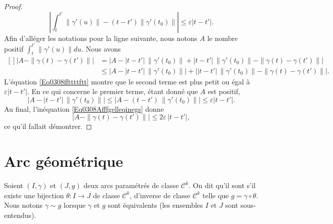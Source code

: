\begin{proof}
    \begin{equation}
        \left| \int_t^{t'}\big\| \gamma'(u) \big\|-(t-t')\big\| \gamma'(t_0) \big\| \right| \leq\varepsilon| t-t' |.
    \end{equation}
    Afin d'alléger les notations pour la ligne suivante, nous notons $A$ le nombre positif $\int_t^{t'}\| \gamma'(u) \|du$. Nous avons
    \begin{equation}        \label{Eq0308Afffgelleqinegs}
        \begin{aligned}[]
        \Big| A-\| \gamma(t)-\gamma(t')\| \Big| &=\Big| A-| t-t' |\,\| \gamma'(t_0) \|+| t-t' |\,\| \gamma'(t_0) \|-\| \gamma(t)-\gamma(t') \| \Big| \\
                &\leq\Big|  A-| t-t' |\,\| \gamma'(t_0) \|  \Big|+\Big| | t-t' |\,\| \gamma'(t_0) \|-\| \gamma(t)-\gamma(t') \|    \Big|.
        \end{aligned}
    \end{equation}
    L'équation \eqref{Eq0308ffttttftt} montre que le second terme est plus petit ou égal à $\varepsilon| t-t' |$. En ce qui concerne le premier terme, étant donné que $A$ est positif,
    \begin{equation}
        \Big|   A-| t-t' |\,\| \gamma'(t_0) \|   \Big| \leq\Big|  A-(t-t')\,\| \gamma'(t_0) \|  \Big|\leq \varepsilon| t-t' |.
    \end{equation}
    Au final, l'inéquation \eqref{Eq0308Afffgelleqinegs} donne
    \begin{equation}
            \Big| A-\| \gamma(t)-\gamma(t')\| \Big| \leq 2\varepsilon\,| t-t' |,
    \end{equation}
    ce qu'il fallait démontrer.
\end{proof}

\section{Arc géométrique}
\label{SecArcGeometrique}

\begin{definition}      \label{DefAcrEquiva}
Soient $(I,\gamma)$ et $(J,g)$ deux arcs paramétrés de classe $\mathcal{C}^k$. On dit qu'il sont  s'il existe une bijection $\theta\colon I\to J$ de classe $\mathcal{C}^k$, d'inverse de classe $\mathcal{C}^k$ telle que $g=\gamma\circ\theta$. Nous notons $\gamma\sim g$ lorsque $\gamma$ et $g$ sont équivalents (les ensembles $I$ et $J$ sont sous-entendus).
\end{definition}

